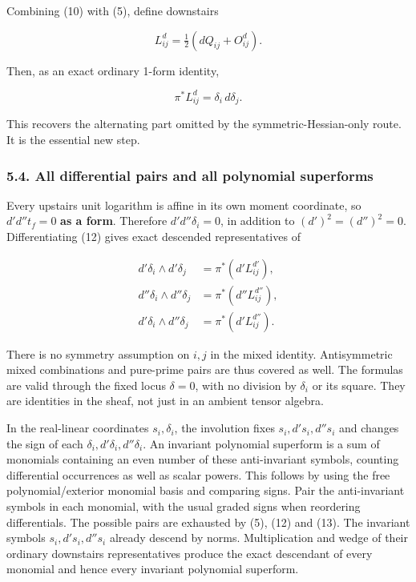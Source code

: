\documentclass[
  11pt,
]{article}
\begin{document}
Combining (10) with (5), define downstairs

\[L_{ij}^{d}=\tfrac12(dQ_{ij}+O_{ij}^{d}). \tag{11}\]

Then, as an exact ordinary 1-form identity,

\[\pi^*L_{ij}^{d}=\delta_i\,d\delta_j. \tag{12}\]

This recovers the alternating part omitted by the symmetric-Hessian-only
route. It is the essential new step.

\subsubsection{5.4. All differential pairs and all polynomial
superforms}\label{all-differential-pairs-and-all-polynomial-superforms}

Every upstairs unit logarithm is affine in its own moment coordinate, so
\(d'd''t_f=0\) \textbf{as a form}. Therefore \(d'd''\delta_i=0\), in
addition to \((d')^2=(d'')^2=0\). Differentiating (12) gives exact
descended representatives of

\[
\begin{aligned}
d'\delta_i\wedge d'\delta_j&=\pi^*(d'L_{ij}^{d'}),\\
d''\delta_i\wedge d''\delta_j&=\pi^*(d''L_{ij}^{d''}),\\
d'\delta_i\wedge d''\delta_j&=\pi^*(d'L_{ij}^{d''}).
\end{aligned} \tag{13}
\]

There is no symmetry assumption on \(i,j\) in the mixed identity.
Antisymmetric mixed combinations and pure-prime pairs are thus covered
as well. The formulas are valid through the fixed locus \(\delta=0\),
with no division by \(\delta_i\) or its square. They are identities in
the sheaf, not just in an ambient tensor algebra.

In the real-linear coordinates \(s_i,\delta_i\), the involution fixes
\(s_i,d's_i,d''s_i\) and changes the sign of each
\(\delta_i,d'\delta_i,d''\delta_i\). An invariant polynomial superform
is a sum of monomials containing an even number of these anti-invariant
symbols, counting differential occurrences as well as scalar powers.
This follows by using the free polynomial/exterior monomial basis and
comparing signs. Pair the anti-invariant symbols in each monomial, with
the usual graded signs when reordering differentials. The possible pairs
are exhausted by (5), (12) and (13). The invariant symbols
\(s_i,d's_i,d''s_i\) already descend by norms. Multiplication and wedge
of their ordinary downstairs representatives produce the exact
descendant of every monomial and hence every invariant polynomial
superform.
\end{document}
